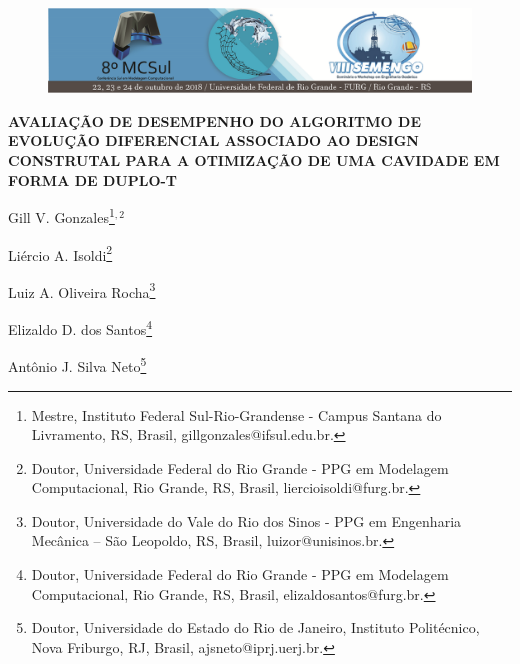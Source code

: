 \documentclass[12pt,A4,A4pt]{article}
\begin{document}

\begin{figure}
\centering
\vspace{-1cm}
\begin{minipage}[c]{\textwidth}
\centering
    \includegraphics[width=6.2in]{cabecalho.eps}
\end{minipage}
\end{figure}

\begin{center}
\fontsize{16pt}{\baselineskip}\selectfont 
\textbf{{AVALIAÇÃO DE DESEMPENHO DO ALGORITMO DE EVOLUÇÃO DIFERENCIAL ASSOCIADO AO DESIGN CONSTRUTAL PARA A OTIMIZAÇÃO DE UMA CAVIDADE EM FORMA DE DUPLO-T}}
\end{center}
\vspace{-0.9cm}

\begin{flushright}
Gill V. Gonzales\footnote{Mestre, Instituto Federal Sul-Rio-Grandense - Campus Santana do Livramento, RS, Brasil, gillgonzales@ifsul.edu.br.}$^{,2}$

Liércio A. Isoldi\footnote{Doutor, Universidade Federal do Rio Grande - PPG em Modelagem Computacional, Rio Grande, RS, Brasil, liercioisoldi@furg.br.}

Luiz A. Oliveira Rocha\footnote{Doutor, Universidade do Vale do Rio dos Sinos - PPG em Engenharia Mecânica – São Leopoldo, RS, Brasil, luizor@unisinos.br.}

Elizaldo D. dos Santos\footnote{Doutor, Universidade Federal do Rio Grande - PPG em Modelagem Computacional, Rio Grande, RS, Brasil, elizaldosantos@furg.br.}

Antônio J. Silva Neto\footnote{Doutor, Universidade do Estado do Rio de Janeiro, Instituto Politécnico, Nova Friburgo, RJ, Brasil, ajsneto@iprj.uerj.br.}

\end{flushright}
\end{document}

